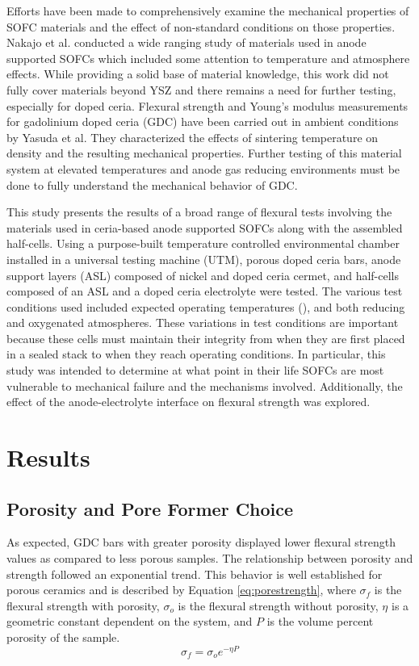 Efforts have been made to comprehensively examine the mechanical properties of SOFC materials and the effect of non-standard conditions on those properties.
Nakajo et al. conducted a wide ranging study of materials used in anode supported SOFCs which included some attention to temperature and atmosphere effects.\cite{Nakajo2012}
While providing a solid base of material knowledge, this work did not fully cover materials beyond YSZ and there remains a need for further testing, especially for doped ceria.
Flexural strength and Young's modulus measurements for gadolinium doped ceria (GDC) have been carried out in ambient conditions by Yasuda et al.\cite{Yasuda2012}
They characterized the effects of sintering temperature on density and the resulting mechanical properties.
Further testing of this material system at elevated temperatures and anode gas reducing environments must be done to fully understand the mechanical behavior of
GDC.

This study presents the results of a broad range of flexural tests involving the materials used in ceria-based anode supported SOFCs along with the assembled half-cells.
Using a purpose-built temperature controlled environmental chamber installed in a universal testing machine (UTM), porous doped ceria bars, anode support layers (ASL)
composed of nickel and doped ceria cermet, and half-cells composed of an
ASL and a doped ceria electrolyte were tested.
The various test conditions used included expected operating temperatures (), and both reducing and oxygenated atmospheres.
These variations in test conditions are important because these cells must maintain their integrity from when they are first placed in a sealed stack to when they reach operating conditions.
In particular, this study was intended to determine at what point in their life SOFCs are most vulnerable to mechanical failure and the mechanisms involved.
Additionally, the effect of the anode-electrolyte interface on flexural strength was explored.

\section{Results}

\subsection{Porosity and Pore Former Choice}

As expected, GDC bars with greater porosity displayed lower flexural strength values as compared to less porous samples.
The relationship between porosity and strength followed an exponential trend.
This behavior is well established for porous ceramics and is described by
Equation \ref{eq:porestrength}, where \(\sigma_{f}\) is the flexural strength with porosity,
\(\sigma_{o}\) is the flexural strength without porosity, \(\eta\) is a geometric constant dependent on the system, and \(P\) is the volume percent porosity of the sample.\cite{Rice1998}
\begin{equation}
    \sigma_f = \sigma_o e^{-\eta{}P}
    \label{eq:porestrength}
\end{equation}


